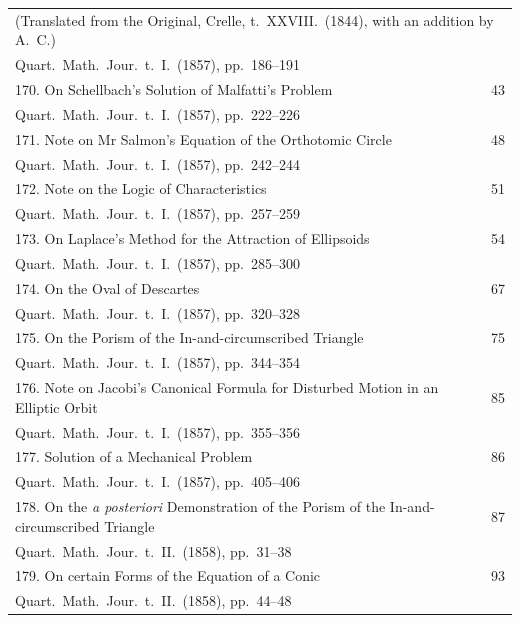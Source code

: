 \documentclass[11pt,a4paper]{book}
\begin{document}
\begin{longtable}{p{}r}
\multicolumn{2}{l}{\small (Translated from the Original, Crelle, t.~XXVIII.\ (1844), with an addition by A.~C.)} \\
\multicolumn{2}{l}{\small Quart.\ Math.\ Jour.\ t.~I.\ (1857), pp.~186--191} \\[0.5em]
%
170. On Schellbach's Solution of Malfatti's Problem \dotfill & 43 \\
\multicolumn{2}{l}{\small Quart.\ Math.\ Jour.\ t.~I.\ (1857), pp.~222--226} \\[0.5em]
%
171. Note on Mr Salmon's Equation of the Orthotomic Circle \dotfill & 48 \\
\multicolumn{2}{l}{\small Quart.\ Math.\ Jour.\ t.~I.\ (1857), pp.~242--244} \\[0.5em]
%
172. Note on the Logic of Characteristics \dotfill & 51 \\
\multicolumn{2}{l}{\small Quart.\ Math.\ Jour.\ t.~I.\ (1857), pp.~257--259} \\[0.5em]
%
173. On Laplace's Method for the Attraction of Ellipsoids \dotfill & 54 \\
\multicolumn{2}{l}{\small Quart.\ Math.\ Jour.\ t.~I.\ (1857), pp.~285--300} \\[0.5em]
%
174. On the Oval of Descartes \dotfill & 67 \\
\multicolumn{2}{l}{\small Quart.\ Math.\ Jour.\ t.~I.\ (1857), pp.~320--328} \\[0.5em]
%
175. On the Porism of the In-and-circumscribed Triangle \dotfill & 75 \\
\multicolumn{2}{l}{\small Quart.\ Math.\ Jour.\ t.~I.\ (1857), pp.~344--354} \\[0.5em]
%
176. Note on Jacobi's Canonical Formula for Disturbed Motion in an Elliptic Orbit \dotfill & 85 \\
\multicolumn{2}{l}{\small Quart.\ Math.\ Jour.\ t.~I.\ (1857), pp.~355--356} \\[0.5em]
%
177. Solution of a Mechanical Problem \dotfill & 86 \\
\multicolumn{2}{l}{\small Quart.\ Math.\ Jour.\ t.~I.\ (1857), pp.~405--406} \\[0.5em]
%
178. On the \textit{a posteriori} Demonstration of the Porism of the In-and-circumscribed Triangle \dotfill & 87 \\
\multicolumn{2}{l}{\small Quart.\ Math.\ Jour.\ t.~II.\ (1858), pp.~31--38} \\[0.5em]
%
179. On certain Forms of the Equation of a Conic \dotfill & 93 \\
\multicolumn{2}{l}{\small Quart.\ Math.\ Jour.\ t.~II.\ (1858), pp.~44--48} \\[0.5em]
\bottomrule
\end{longtable}
\end{document}

